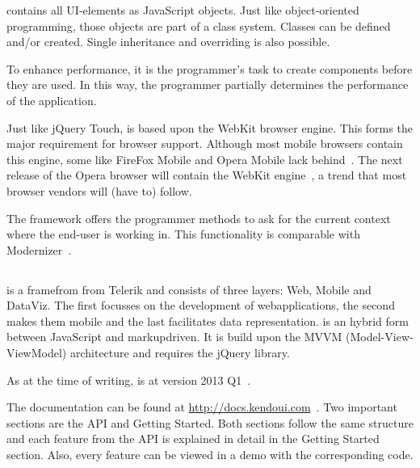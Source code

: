 \documentclass[a4paper]{artikel3}
\renewcommand{\url}[1]{\href{#1}{#1}}
\newcommand{\setspace}[0]{\vspace{2mm}}
\renewcommand{\paragraph}[1]{\setspace \noindent {\bf #1}  }
\begin{document}
\sta{} contains all UI-elements as JavaScript objects.  
Just like object-oriented programming,  those objects are part of a class system.  
Classes can be defined and/or created.  
Single inheritance and overriding is also possible.    

To enhance performance,  it is the programmer's task to create components before they are used.  
In this way,  the programmer partially determines the performance of the application.

\paragraph{Browser support}
Just like jQuery Touch,  \sta{} is based upon the WebKit browser engine.  
This forms the major requirement for browser support.  
Although most mobile browsers contain this engine,  some like FireFox Mobile and Opera Mobile lack behind~\cite{JohnEClark2012}.  
The next release of the Opera browser will contain the WebKit engine~\cite{Wokke2013}, a trend that most browser vendors will (have to) follow.

The framework offers the programmer methods to ask for the current context where the end-user is working in.
This functionality is comparable with Modernizer~\cite{Modernizr2012}.  


\subsection{\kendo} %
\label{sec:frameworks-kendo}

\kendo{} is a framefrom from Telerik and consists of three layers:  \kendo{} Web,  \kendo{} Mobile and \kendo{} DataViz.
The first focusses on the development of webapplications,  the second makes them mobile and the last facilitates data representation.
\kendo{} is an hybrid form between JavaScript and markupdriven.
It is build upon the MVVM (Model-View-ViewModel) architecture and requires the jQuery library.

As at the time of writing,  \kendo{} is at version 2013 Q1~\cite{Telerik}. 

\paragraph{Documentation}
The documentation can be found at \url{http://docs.kendoui.com}~\cite{Telerikd}.
Two important sections are the API and Getting Started.
Both sections follow the same structure and each feature from the API is explained in detail in the Getting Started section.
Also,  every feature can be viewed in a demo with the corresponding code.
\end{document}
